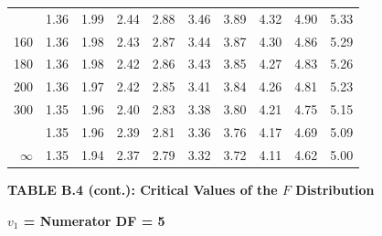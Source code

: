 \documentclass[10pt]{article}
\begin{document}
\begin{longtable}{@{}r!{\vrule width 0.8pt\hspace{0.55em}}rrrrrrrrr@{}}
 & 1.36 & 1.99 & 2.44 & 2.88 & 3.46 & 3.89 & 4.32 & 4.90 & 5.33 \\
160 & 1.36 & 1.98 & 2.43 & 2.87 & 3.44 & 3.87 & 4.30 & 4.86 & 5.29 \\
180 & 1.36 & 1.98 & 2.42 & 2.86 & 3.43 & 3.85 & 4.27 & 4.83 & 5.26 \\
200 & 1.36 & 1.97 & 2.42 & 2.85 & 3.41 & 3.84 & 4.26 & 4.81 & 5.23 \\
300 & 1.35 & 1.96 & 2.40 & 2.83 & 3.38 & 3.80 & 4.21 & 4.75 & 5.15 \\
 & 1.35 & 1.96 & 2.39 & 2.81 & 3.36 & 3.76 & 4.17 & 4.69 & 5.09 \\
$\infty$ & 1.35 & 1.94 & 2.37 & 2.79 & 3.32 & 3.72 & 4.11 & 4.62 & 5.00 \\
\end{longtable}
\newpage
\thispagestyle{empty}
\begin{center}
{\large\bfseries TABLE B.4 (cont.): Critical Values of the $F$ Distribution\par}
\end{center}
{\large\bfseries $v_1$ = Numerator DF = 5\par}
\vspace{0.5em}
\small
\end{document}
